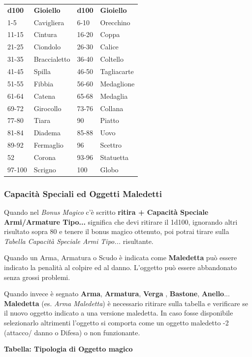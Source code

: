 \begin{multicols}{2}
{{\begin{tabular}{l|l|l|l}
\textbf{d100} & \textbf{Gioiello} & \textbf{d100} & \textbf{Gioiello}\\
1-5 & Cavigliera & 6-10 & Orecchino \\
11-15 & Cintura& 16-20 & Coppa\\
21-25 & Ciondolo& 26-30 & Calice\\
31-35 & Braccialetto& 36-40 & Coltello\\
41-45 & Spilla& 46-50 & Tagliacarte\\
51-55 & Fibbia& 56-60 & Medaglione\\
61-64 & Catena& 65-68 & Medaglia\\
69-72 & Girocollo& 73-76 & Collana\\
77-80 & Tiara& 90& Piatto\\
81-84 & Diadema& 85-88 & Uovo\\
89-92 & Fermaglio& 96 & Scettro\\
52    & Corona& 93-96 & Statuetta\\
97-100 & Scrigno& 100 & Globo
\end{tabular}}


\subsubsection{Capacità Speciali ed Oggetti Maledetti}

Quando nel \emph{Bonus Magico} c'è scritto \textbf{ritira + Capacità Speciale Armi/Armature Tipo...} significa che devi ritirare il 1d100, ignorando altri risultato sopra 80 e tenere il bonus magico ottenuto, poi potrai tirare sulla \emph{Tabella Capacità Speciale Armi Tipo...} risultante.

Quando un Arma, Armatura o Scudo è indicata come \textbf{Maledetta} può essere indicato la penalità al colpire ed al danno. L'oggetto può essere abbandonato senza grossi problemi.

Quando invece è segnato \textbf{Arma}, \textbf{Armatura}, \textbf{Verga} , \textbf{Bastone}, \textbf{Anello}... \textbf{Maledetta} (es. \emph{Arma Maledetta}) è necessario ritirare sulla tabella e verificare se il nuovo oggetto indicato a una versione maledetta. In caso fosse disponibile selezionarlo altrimenti l'oggetto si comporta come un oggetto maledetto -2 (attacco/ danno o Difesa) o non funzionante.\hypertarget{Arma Maledetta}{}\hypertarget{Maledetta}{}\hypertarget{Armatura Maledetta}{}

\medskip

\textbf{Tabella: Tipologia di Oggetto magico}\label{tipologiaoggettomagico}\hypertarget{tipologiaoggettomagico}{}

}
\end{multicols}
